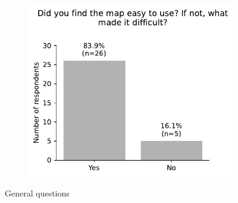 \begin{appendices}
\begin{figure}[H]
\begin{subfigure}[b]{0.5\textwidth}
	\end{subfigure}%
	\begin{subfigure}[b]{0.5\textwidth}
		\centering
		\includegraphics[width=\textwidth]{visual/figures/survey/9.pdf}
	\end{subfigure}%
	\caption{General questions}
	\label{fig:general questions}
\end{figure}

\end{appendices}
